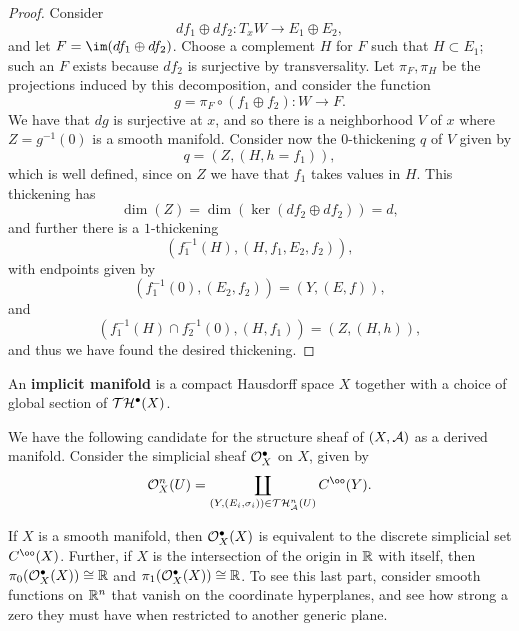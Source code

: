 \begin{proof}

Consider
\[ df_1 \oplus df_2 : T_x W \to E_1 \oplus E_2, \]
and let $F = \im(df_1 \oplus df_2)$. Choose a complement $H$ for $F$ such that $H \subset E_1$; such an $F$ exists because $df_2$ is surjective by transversality. Let $\pi_F, \pi_H$ be the projections induced by this decomposition, and consider the function 
\[g = \pi_F \circ (f_1 \oplus f_2) : W \to F.\]
We have that $dg$ is surjective at $x$, and so there is a neighborhood $V$ of $x$ where $Z = g^{-1}(0)$ is a smooth manifold. Consider now the $0$-thickening $q$ of $V$ given by
\[ q = (Z, (H, h = f_1)),\]
which is well defined, since on $Z$ we have that $f_1$ takes values in $H$. This thickening has
\[ \dim(Z) = \dim(\ker(df_2 \oplus df_2)) = d,\]
and further there is a $1$-thickening
\[ (f_1^{-1}(H), (H, f_1, E_2, f_2)), \]
with endpoints given by
\[ (f_1^{-1}(0), (E_2, f_2)) = (Y, (E, f)), \]
and
\[ (f_1^{-1}(H) \cap f_2^{-1}(0), (H, f_1)) = (Z, (H, h)), \]
and thus we have found the desired thickening.

\end{proof}

\begin{definition}\label{implicit-manifold}
An {\bf implicit manifold} is a compact Hausdorff space $X$ together with a choice of global section of $\mathcal T \mathcal H^\bullet(X)$. 
\end{definition}

We have the following candidate for the structure sheaf of $(X, \mathcal A)$ as a derived manifold. Consider the simplicial sheaf $\mathcal O_X^\bullet$ on $X$, given by
\[ \cO_X^n(U) = \coprod_{(Y, (E_i, \sigma_i)) \in \cT \cH_\cA^n(U)} C^\oo(Y). \]


\begin{speculation}
If $X$ is a smooth manifold, then $\mathcal O_X^\bullet(X)$ is equivalent to the discrete simplicial set $C^\oo(X)$. Further, if $X$ is the intersection of the origin in $\mathbb R$ with itself, then $\pi_0(\mathcal O_X^\bullet(X)) \cong \mathbb R$ and $\pi_1(\mathcal O_X^\bullet(X)) \cong \mathbb R$. To see this last part, consider smooth functions on $\mathbb R^n$ that vanish on the coordinate hyperplanes, and see how strong a zero they must have when restricted to another generic plane.
\end{speculation}